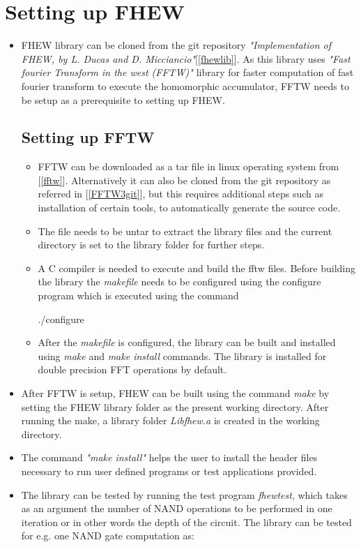  \section{Setting up FHEW}
\begin{itemize}
\item
FHEW library can be cloned from the git repository \textit{"Implementation of FHEW, by L. Ducas and D. Micciancio"}[\ref{fhewlib}]. As this library uses \textit{"Fast fourier Transform in the west (FFTW)"} library for faster computation of fast fourier transform to execute the homomorphic accumulator, FFTW needs to be setup as a prerequisite to setting up FHEW.
\subsection{Setting up FFTW} \label{3.4.1}
\begin{itemize}
\item
FFTW can be downloaded as a tar file in linux operating system from [\ref{fftw}]. Alternatively it can also be cloned from the git repository as referred in [\ref{FFTW3git}], but this requires additional steps such as installation of certain tools, to automatically generate the source code.
\item
The file needs to be untar to extract the library files and the current directory is set to the library folder for further steps.
\item 
A C compiler is needed to execute and build the fftw files. Before building the library the \textit{makefile} needs to be configured using the configure program which is executed using the command

\hspace{3cm} ./configure

\item
After the \textit{makefile} is configured, the library can be built and installed using \textit{make} and \textit{make install} commands. The library is installed for double precision FFT operations by default.
\end{itemize}
\item
After FFTW is setup, FHEW can be built using the command \textit{make} by setting the FHEW library folder as the present working directory. After running the make, a library folder \textit{Libfhew.a} is created in the working directory.
\item
The command \textit{"make install"} helps the user to install the header files necessary to run user defined programs or test applications provided.
\item
The library can be tested by running the test program \textit{fhewtest}, which takes as an argument the number of NAND operations to be performed in one iteration or in other words the depth of the circuit.
The library can be tested for e.g. one NAND gate computation as:


\end{itemize}
